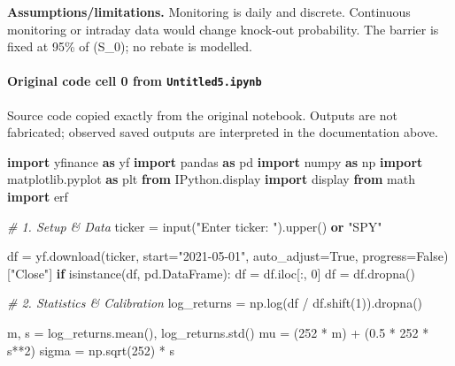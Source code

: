 \documentclass[
  11pt,
]{article}
\newenvironment{Shaded}{}{}
\newcommand{\BuiltInTok}[1]{\textcolor[rgb]{0.00,0.50,0.00}{#1}}
\newcommand{\CommentTok}[1]{\textcolor[rgb]{0.38,0.63,0.69}{\textit{#1}}}
\newcommand{\ControlFlowTok}[1]{\textcolor[rgb]{0.00,0.44,0.13}{\textbf{#1}}}
\newcommand{\DecValTok}[1]{\textcolor[rgb]{0.25,0.63,0.44}{#1}}
\newcommand{\FloatTok}[1]{\textcolor[rgb]{0.25,0.63,0.44}{#1}}
\newcommand{\ImportTok}[1]{\textcolor[rgb]{0.00,0.50,0.00}{\textbf{#1}}}
\newcommand{\KeywordTok}[1]{\textcolor[rgb]{0.00,0.44,0.13}{\textbf{#1}}}
\newcommand{\NormalTok}[1]{#1}
\newcommand{\OperatorTok}[1]{\textcolor[rgb]{0.40,0.40,0.40}{#1}}
\newcommand{\StringTok}[1]{\textcolor[rgb]{0.25,0.44,0.63}{#1}}
\newcommand{\VariableTok}[1]{\textcolor[rgb]{0.10,0.09,0.49}{#1}}
\begin{document}
\textbf{Assumptions/limitations.} Monitoring is daily and discrete. Continuous monitoring or intraday data would change knock-out probability. The barrier is fixed at 95\% of (S\_0); no rebate is modelled.

\paragraph{\texorpdfstring{Original code cell 0 from \texttt{Untitled5.ipynb}}{Original code cell 0 from Untitled5.ipynb}}\label{original-code-cell-0-from-untitled5ipynb}

Source code copied exactly from the original notebook. Outputs are not fabricated; observed saved outputs are interpreted in the documentation above.

\begin{Shaded}
\begin{Highlighting}[]
\ImportTok{import}\NormalTok{ yfinance }\ImportTok{as}\NormalTok{ yf}
\ImportTok{import}\NormalTok{ pandas }\ImportTok{as}\NormalTok{ pd}
\ImportTok{import}\NormalTok{ numpy }\ImportTok{as}\NormalTok{ np}
\ImportTok{import}\NormalTok{ matplotlib.pyplot }\ImportTok{as}\NormalTok{ plt}
\ImportTok{from}\NormalTok{ IPython.display }\ImportTok{import}\NormalTok{ display}
\ImportTok{from}\NormalTok{ math }\ImportTok{import}\NormalTok{ erf}

\CommentTok{\# 1. Setup \& Data}
\NormalTok{ticker }\OperatorTok{=} \BuiltInTok{input}\NormalTok{(}\StringTok{"Enter ticker: "}\NormalTok{).upper() }\KeywordTok{or} \StringTok{"SPY"}

\NormalTok{df }\OperatorTok{=}\NormalTok{ yf.download(ticker, start}\OperatorTok{=}\StringTok{"2021{-}05{-}01"}\NormalTok{, auto\_adjust}\OperatorTok{=}\VariableTok{True}\NormalTok{, progress}\OperatorTok{=}\VariableTok{False}\NormalTok{)[}\StringTok{"Close"}\NormalTok{]}
\ControlFlowTok{if} \BuiltInTok{isinstance}\NormalTok{(df, pd.DataFrame): df }\OperatorTok{=}\NormalTok{ df.iloc[:, }\DecValTok{0}\NormalTok{]}
\NormalTok{df }\OperatorTok{=}\NormalTok{ df.dropna()}

\CommentTok{\# 2. Statistics \& Calibration}
\NormalTok{log\_returns }\OperatorTok{=}\NormalTok{ np.log(df }\OperatorTok{/}\NormalTok{ df.shift(}\DecValTok{1}\NormalTok{)).dropna()}

\NormalTok{m, s }\OperatorTok{=}\NormalTok{ log\_returns.mean(), log\_returns.std()}
\NormalTok{mu }\OperatorTok{=}\NormalTok{ (}\DecValTok{252} \OperatorTok{*}\NormalTok{ m) }\OperatorTok{+}\NormalTok{ (}\FloatTok{0.5} \OperatorTok{*} \DecValTok{252} \OperatorTok{*}\NormalTok{ s}\OperatorTok{**}\DecValTok{2}\NormalTok{)}
\NormalTok{sigma }\OperatorTok{=}\NormalTok{ np.sqrt(}\DecValTok{252}\NormalTok{) }\OperatorTok{*}\NormalTok{ s}


\end{Highlighting}
\end{Shaded}
\end{document}
